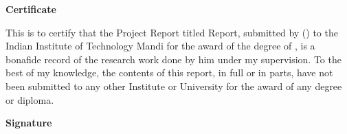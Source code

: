 \begin{flushright}
\huge{\textbf{Certificate}}
\end{flushright}
This is to certify that the Project Report titled \ttitle{} Report, submitted by \authorname{}(\rn{}) to the Indian Institute of Technology Mandi for the award of the degree of \degree{}, is a bonafide record of the research work done by him under my supervision. To the best of my knowledge, the contents of this report, in full or in parts, have not been submitted to any other Institute or University for the award of any degree or diploma.
\vspace{2cm}
\begin{flushright}
\large{\textbf{Signature}}\\
\supname\\
\end{flushright}

